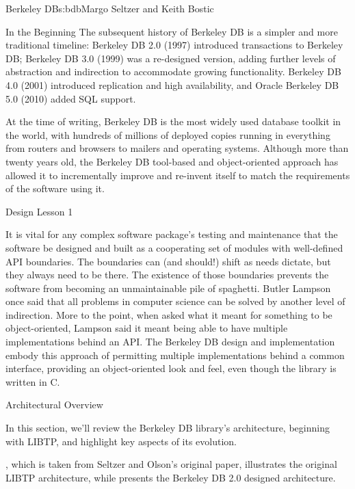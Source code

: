 \begin{aosachapter}{Berkeley DB}{s:bdb}{Margo Seltzer and Keith Bostic}
\begin{aosasect1}{In the Beginning}
The subsequent history of Berkeley DB is a simpler and more
traditional timeline: Berkeley DB 2.0 (1997) introduced transactions
to Berkeley DB; Berkeley DB 3.0 (1999) was a re-designed version,
adding further levels of abstraction and indirection to accommodate
growing functionality. Berkeley DB 4.0 (2001) introduced replication
and high availability, and Oracle Berkeley DB 5.0 (2010) added SQL
support.

At the time of writing, Berkeley DB is the most widely used database
toolkit in the world, with hundreds of millions of deployed copies
running in everything from routers and browsers to mailers and
operating systems. Although more than twenty years old, the Berkeley
DB tool-based and object-oriented approach has allowed it to
incrementally improve and re-invent itself to match the requirements
of the software using it. 

\begin{aosabox}{Design Lesson 1}

It is vital for any complex software package's testing and maintenance
that the software be designed and built as a cooperating set of
modules with well-defined API boundaries. The boundaries can (and
should!) shift as needs dictate, but they always need to be there.
The existence of those boundaries prevents the software from becoming
an unmaintainable pile of spaghetti. Butler Lampson once said that all
problems in computer science can be solved by another level of
indirection. More to the point, when asked what it meant for something
to be object-oriented, Lampson said it meant being able to have
multiple implementations behind an API\@. The Berkeley DB design and
implementation embody this approach of permitting multiple
implementations behind a common interface, providing an
object-oriented look and feel, even though the library is written in
C.

\end{aosabox}

\end{aosasect1}

\begin{aosasect1}{Architectural Overview}

In this section, we'll review the Berkeley DB library's architecture,
beginning with LIBTP, and highlight key aspects of its evolution.

, which is taken from Seltzer and Olson's
original paper, illustrates the original LIBTP architecture, while
 presents the Berkeley DB 2.0 designed
architecture.


\end{aosasect1}
\end{aosachapter}
